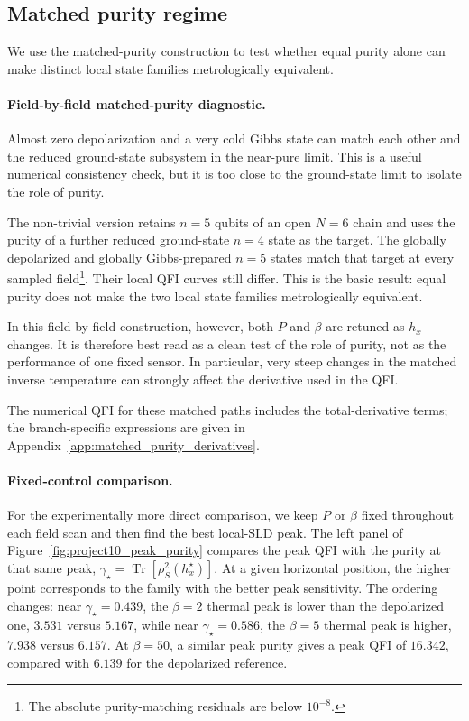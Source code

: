 \subsection{Matched purity regime}
\label{sec:project10_peak_purity}

We use the matched-purity construction to test whether equal purity alone can make distinct local state families metrologically equivalent.

\paragraph{Field-by-field matched-purity diagnostic.}
Almost zero depolarization and a very cold Gibbs state can match each other and the reduced ground-state subsystem in the near-pure limit. This is a useful numerical consistency check, but it is too close to the ground-state limit to isolate the role of purity.

The non-trivial version retains $n=5$ qubits of an open $N=6$ chain and uses
the purity of a further reduced ground-state $n=4$ state as the target.  The
globally depolarized and globally Gibbs-prepared $n=5$ states match that target
at every sampled field\footnote{The absolute purity-matching residuals are below $10^{-8}$.}. Their local QFI
curves still differ.  This is the basic result: equal purity does not make the
two local state families metrologically equivalent.

In this field-by-field construction, however, both $P$ and $\beta$ are
retuned as $h_x$ changes.  It is therefore best read as a clean test of the
role of purity, not as the performance of one fixed sensor.  In particular,
very steep changes in the matched inverse temperature can strongly affect the
derivative used in the QFI.

The numerical QFI for these matched paths includes the total-derivative terms; the branch-specific expressions are given in Appendix~\ref{app:matched_purity_derivatives}.

\paragraph{Fixed-control comparison.}
For the experimentally more direct comparison, we keep $P$ or $\beta$ fixed
throughout each field scan and then find the best local-SLD peak.  The left
panel of Figure~\ref{fig:project10_peak_purity} compares the peak QFI with the
purity at that same peak, $\gamma_\star=\operatorname{Tr}[\rho_S^2(h_x^\star)]$. At a given horizontal position, the higher point
corresponds to the family with the better peak sensitivity.  The ordering
changes: near $\gamma_\star=0.439$, the $\beta=2$ thermal peak is lower than
the depolarized one, $3.531$ versus $5.167$, while near
$\gamma_\star=0.586$, the $\beta=5$ thermal peak is higher, $7.938$ versus
$6.157$.  At $\beta=50$, a similar peak purity gives a peak QFI of $16.342$,
compared with $6.139$ for the depolarized reference.


